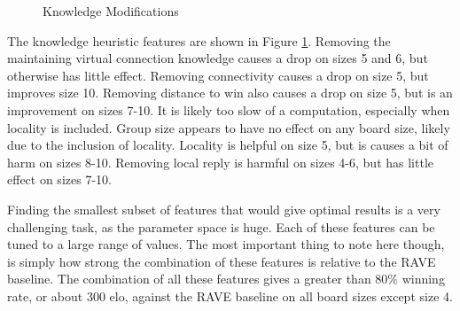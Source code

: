 \begin{figure}
	\centering
{}
	\caption{Knowledge Modifications}
	\label{fig:comboknow}
\end{figure}

The knowledge heuristic features are shown in Figure \ref{fig:comboknow}. Removing the maintaining virtual connection knowledge causes a drop on sizes 5 and 6, but otherwise has little effect. Removing connectivity causes a drop on size 5, but improves size 10. Removing distance to win also causes a drop on size 5, but is an improvement on sizes 7-10. It is likely too slow of a computation, especially when locality is included. Group size appears to have no effect on any board size, likely due to the inclusion of locality. Locality is helpful on size 5, but is causes a bit of harm on sizes 8-10. Removing local reply is harmful on sizes 4-6, but has little effect on sizes 7-10.

Finding the smallest subset of features that would give optimal results is a very challenging task, as the parameter space is huge. Each of these features can be tuned to a large range of values. The most important thing to note here though, is simply how strong the combination of these features is relative to the RAVE baseline. The combination of all these features gives a greater than 80\% winning rate, or about 300 elo, against the RAVE baseline on all board sizes except size 4.

